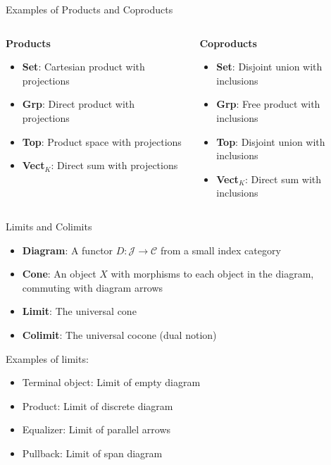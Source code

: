 \documentclass{beamer}
\begin{document}
\begin{frame}{Examples of Products and Coproducts}
    \begin{columns}
        \begin{column}{0.5\textwidth}
            \textbf{Products}
            \begin{itemize}
                \item \textbf{Set}: Cartesian product with projections
                \item \textbf{Grp}: Direct product with projections
                \item \textbf{Top}: Product space with projections
                \item \textbf{Vect$_K$}: Direct sum with projections
            \end{itemize}
        \end{column}
        \begin{column}{0.5\textwidth}
            \textbf{Coproducts}
            \begin{itemize}
                \item \textbf{Set}: Disjoint union with inclusions
                \item \textbf{Grp}: Free product with inclusions
                \item \textbf{Top}: Disjoint union with inclusions
                \item \textbf{Vect$_K$}: Direct sum with inclusions
            \end{itemize}
        \end{column}
    \end{columns}
\end{frame}

\begin{frame}{Limits and Colimits}
    \begin{itemize}
        \item \textbf{Diagram}: A functor $D: \mathcal{J} \to \mathcal{C}$ from a small index category
        \item \textbf{Cone}: An object $X$ with morphisms to each object in the diagram, commuting with diagram arrows
        \item \textbf{Limit}: The universal cone
        \item \textbf{Colimit}: The universal cocone (dual notion)
    \end{itemize}
    
    Examples of limits:
    \begin{itemize}
        \item Terminal object: Limit of empty diagram
        \item Product: Limit of discrete diagram
        \item Equalizer: Limit of parallel arrows
        \item Pullback: Limit of span diagram
    \end{itemize}
\end{frame}
\end{document}
